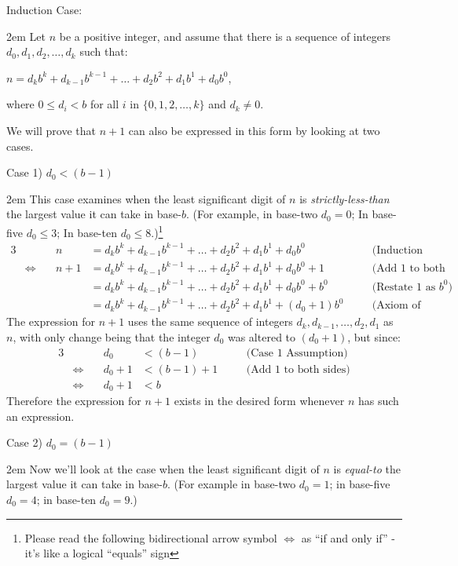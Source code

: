 \documentclass{article}
\newenvironment{jprIn}{\begin{adjustwidth}{2em}{}}{\end{adjustwidth}}
\begin{document}
\break
Induction Case:
\begin{jprIn}
Let $n$ be a positive integer, and assume that
there is a sequence
of integers $d_0, d_1, d_2,\dots{},d_k$ such that:

\hspace{3em}$n=d_kb^k+d_{k-1}b^{k-1}+\dots+d_2b^2+d_1b^1+d_0b^0$,

where $0\le{}d_i<b$ for all $i$ in $\{0,1,2,\dots{},k\}$ and $d_k\ne0$.

We will prove that $n+1$ can also be expressed in this form by
looking at two cases.

\bigskip
Case 1) $d_0<(b-1)$
\begin{jprIn}
This case examines when the least significant
digit of $n$ is \emph{strictly-less-than} the largest value it can take in base-$b$.
(For example, in base-two $d_0 = 0$;
In base-five $d_0\le{}3$;
In base-ten $d_0\le{}8$.)\footnote{Please read the following bidirectional arrow symbol $\Leftrightarrow$ as ``if and only if'' - it's like a logical ``equals'' sign}
\begin{alignat*}{3}
  &&n
  &= d_kb^k+d_{k-1}b^{k-1}+\dots+d_2b^2+d_1b^1+d_0b^0 &&\quad\text{(Induction Assumption)}\\
  &\Leftrightarrow\quad
  &n+1
  &= d_kb^k+d_{k-1}b^{k-1}+\dots+d_2b^2+d_1b^1+d_0b^0 + 1 &&\quad\text{(Add 1 to both sides)}\\  
  &&&= d_kb^k+d_{k-1}b^{k-1}+\dots+d_2b^2+d_1b^1+d_0b^0 + b^0 &&\quad\text{(Restate 1 as }b^0\text{)}\\
  &&&= d_kb^k+d_{k-1}b^{k-1}+\dots+d_2b^2+d_1b^1 + (d_0+1)b^0 &&\quad\text{(Axiom of Distribution)}
\end{alignat*}
The expression for $n+1$ uses the same sequence of integers $d_k, d_{k-1},\dots{},d_2,d_1$ as $n$, with only
change being that the integer $d_0$ was altered to $(d_0{+}1)$, but since:
\begin{alignat*}{3}
  &&d_0
  &< (b-1) &&\quad\text{(Case 1 Assumption)}\\
  &\Leftrightarrow\quad
  &d_0+1
  &< (b-1)+1 &&\quad\text{(Add 1 to both sides)}\\  
  &\Leftrightarrow\quad
  &d_0+1
  &< b
\end{alignat*}
Therefore the expression for $n+1$ exists in the desired form whenever $n$ has such an expression.
\end{jprIn}

\bigskip
Case 2) $d_0=(b-1)$
\begin{jprIn}
Now we'll look at the case when the least significant digit of $n$ is \emph{equal-to}
the largest value it can take in base-$b$.
(For example in base-two
$d_0=1$; in base-five
$d_0=4$; in base-ten $d_0=9$.)


\end{jprIn}
\end{jprIn}
\end{document}

